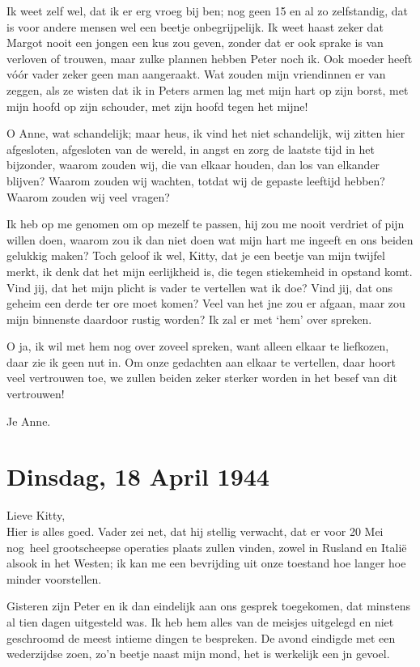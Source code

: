 \documentclass{book}
\begin{document}
Ik weet zelf wel, dat ik er erg vroeg bij ben; nog geen 15 en al zo
zelfstandig, dat is voor andere mensen wel een beetje onbegrijpelijk. Ik
weet haast zeker dat Margot nooit een jongen een kus zou geven, zonder
dat er ook sprake is van verloven of trouwen, maar zulke plannen hebben
Peter noch ik. Ook moeder heeft vóór vader zeker geen man aangeraakt.
Wat zouden mijn vriendinnen er van zeggen, als ze wisten dat ik in
Peters armen lag met mijn hart op zijn borst, met mijn hoofd op zijn
schouder, met zijn hoofd tegen het mijne!

O Anne, wat schandelijk; maar heus, ik vind het niet schandelijk, wij
zitten hier afgesloten, afgesloten van de wereld, in angst en zorg de
laatste tijd in het bijzonder, waarom zouden wij, die van elkaar houden,
dan los van elkander blijven? Waarom zouden wij wachten, totdat wij de
gepaste leeftijd hebben? Waarom zouden wij veel vragen?

Ik heb op me genomen om op mezelf te passen, hij zou me nooit verdriet
of pijn willen doen, waarom zou ik dan niet doen wat mijn hart me
ingeeft en ons beiden gelukkig maken? Toch geloof ik wel, Kitty, dat je
een beetje van mijn twijfel merkt, ik denk dat het mijn eerlijkheid is,
die tegen stiekemheid in opstand komt. Vind jij, dat het mijn plicht is
vader te vertellen wat ik doe? Vind jij, dat ons geheim een derde ter
ore moet komen? Veel van het jne zou er afgaan, maar zou mijn binnenste
daardoor rustig worden? Ik zal er met `hem' over spreken.

O ja, ik wil met hem nog over zoveel spreken, want alleen elkaar te
liefkozen, daar zie ik geen nut in. Om onze gedachten aan elkaar te
vertellen, daar hoort veel vertrouwen toe, we zullen beiden zeker
sterker worden in het besef van dit vertrouwen!

Je Anne.

\chapter{Dinsdag, 18 April 1944}

Lieve Kitty,\\Hier is alles goed. Vader zei net, dat hij stellig
verwacht, dat er voor 20 Mei nog~heel grootscheepse operaties plaats
zullen vinden, zowel in Rusland en Italië alsook in het Westen; ik kan
me een bevrijding uit onze toestand hoe langer hoe minder voorstellen.

Gisteren zijn Peter en ik dan eindelijk aan ons gesprek toegekomen, dat
minstens al tien dagen uitgesteld was. Ik heb hem alles van de meisjes
uitgelegd en niet geschroomd de meest intieme dingen te bespreken. De
avond eindigde met een wederzijdse zoen, zo'n beetje naast mijn mond,
het is werkelijk een jn gevoel.
\end{document}
